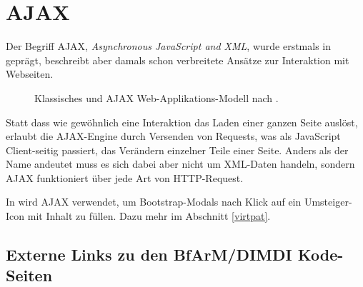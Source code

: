 \section{AJAX}
\label{ajax-sec}

Der Begriff AJAX, \emph{Asynchronous JavaScript and XML}, wurde erstmals in \cite{garrett2005ajax} geprägt, beschreibt aber damals schon verbreitete Ansätze zur Interaktion mit Webseiten.

\begin{figure}[H]
    \centering
    \setlength{\fboxsep}{5pt}\color{black!20}
    \normalcolor\vspace{-0.5em}\caption{Klassisches und AJAX Web-Applikations-Modell nach \cite{garrett2005ajax}.}
\end{figure}

Statt dass wie gewöhnlich eine Interaktion das Laden einer ganzen Seite auslöst, erlaubt die AJAX-Engine durch Versenden von Requests, was als JavaScript Client-seitig passiert, das Verändern einzelner Teile einer Seite. Anders als der Name andeutet muss es sich dabei aber nicht um XML-Daten handeln, sondern AJAX funktioniert über jede Art von HTTP-Request. 

In \bfarmer wird AJAX verwendet, um Bootstrap-Modals nach Klick auf ein Umsteiger-Icon mit Inhalt zu füllen. Dazu mehr im Abschnitt \ref{virtpat}. 

\subsection{Externe Links zu den BfArM/DIMDI Kode-Seiten}
\label{externe-kode-links}

